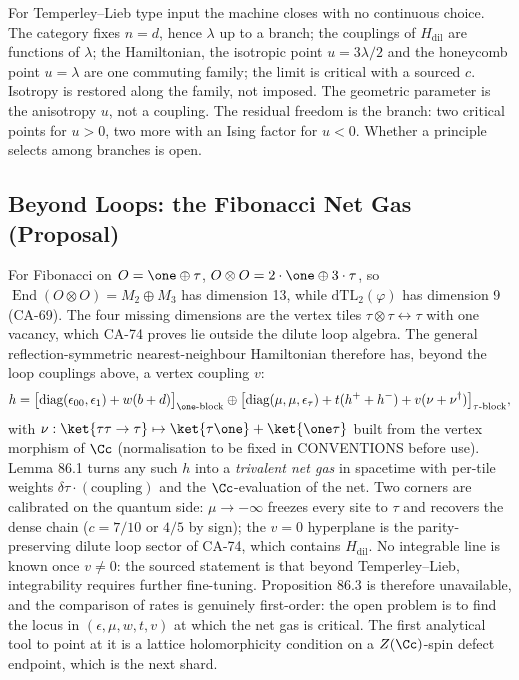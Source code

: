 For Temperley--Lieb type input the machine closes with no continuous
choice.  The category fixes \(n=d\), hence \(\lambda\) up to a branch; the
couplings of \(H_{\mathrm{dil}}\) are functions of \(\lambda\); the
Hamiltonian, the isotropic point \(u=3\lambda/2\) and the honeycomb point
\(u=\lambda\) are one commuting family; the limit is critical with a sourced
\(c\).  Isotropy is restored along the family, not imposed.  The geometric
parameter is the anisotropy \(u\), not a coupling.  The residual freedom is
the branch: two critical points for \(u>0\), two more with an Ising factor
for \(u<0\).  Whether a principle selects among branches is open.

\subsection{Beyond Loops: the Fibonacci Net Gas (Proposal)}

For Fibonacci on \(O=\one\oplus\tau\), \(O\otimes O=2\cdot\one\oplus3\cdot\tau\), so
\(\operatorname{End}(O\otimes O)=M_2\oplus M_3\) has dimension 13, while
\(\mathrm{dTL}_2(\varphi)\) has dimension 9 (CA-69).  The four missing
dimensions are the vertex tiles \(\tau\otimes\tau\leftrightarrow\tau\) with
one vacancy, which CA-74 proves lie outside the dilute loop algebra.  The
general reflection-symmetric nearest-neighbour Hamiltonian therefore has,
beyond the loop couplings above, a vertex coupling \(v\):
\[
  h=\big[\text{diag}(\epsilon_{00},\epsilon_{1})+w(b+d)\big]_{\one\text{-block}}
  \oplus\big[\text{diag}(\mu,\mu,\epsilon_{\tau})+t(h^++h^-)+v(\nu+\nu^\dagger)\big]_{\tau\text{-block}},
\]
with \(\nu:\ket{\tau\tau\to\tau}\mapsto\ket{\tau\one}+\ket{\one\tau}\) built
from the vertex morphism of \(\Cc\) (normalisation to be fixed in
CONVENTIONS before use).  Lemma 86.1 turns any such \(h\) into a
\emph{trivalent net gas} in spacetime with per-tile weights
\(\delta\tau\cdot(\text{coupling})\) and the \(\Cc\)-evaluation of the net.
Two corners are calibrated on the quantum side: \(\mu\to-\infty\) freezes
every site to \(\tau\) and recovers the dense chain (\(c=7/10\) or \(4/5\)
by sign); the \(v=0\) hyperplane is the parity-preserving dilute loop
sector of CA-74, which contains \(H_{\mathrm{dil}}\).  No integrable line is known once \(v\neq0\): the sourced statement is
that beyond Temperley--Lieb, integrability requires further fine-tuning.
Proposition 86.3 is therefore unavailable, and the
comparison of rates is genuinely first-order: the open problem is to find
the locus in \((\epsilon,\mu,w,t,v)\) at which the net gas is critical.  The
first analytical tool to point at it is a lattice holomorphicity condition
on a \(Z(\Cc)\)-spin defect endpoint, which is the next shard.

